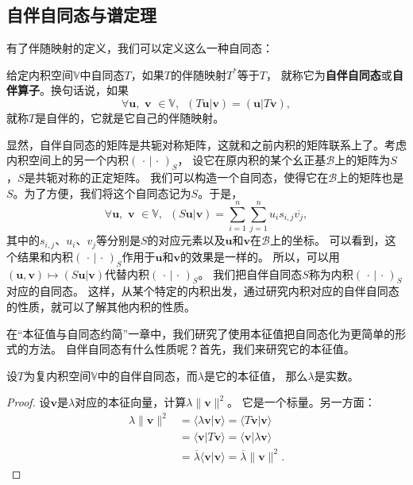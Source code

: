 \documentclass[12pt,UTF8,fontset=none]{ctexbook}
\begin{document}
\subsection{自伴自同态与谱定理}
有了伴随映射的定义，我们可以定义这么一种自同态：
\begin{df}\label{df:8_2}
    给定内积空间$\mathbb{V}$中自同态$T$，如果$T$的伴随映射$T^*$等于$T$，
    就称它为\textbf{自伴自同态}或\textbf{自伴算子}。换句话说，如果
    $$ \forall \mathbf{u}, \,\, \mathbf{v} \,\, \in \mathbb{V},\,\,\, (T\mathbf{u} | \mathbf{v}) = (\mathbf{u} | T\mathbf{v}), $$
    就称$T$是自伴的，它就是它自己的伴随映射。
\end{df}
显然，自伴自同态的矩阵是共轭对称矩阵，这就和之前内积的矩阵联系上了。考虑内积空间上的另一个内积$(\, \cdot \, | \, \cdot \,)_{S}$，
设它在原内积的某个幺正基$\mathcal{B}$上的矩阵为$S$，$S$是共轭对称的正定矩阵。
我们可以构造一个自同态，使得它在$\mathcal{B}$上的矩阵也是$S$。为了方便，我们将这个自同态记为$S$。于是，
$$ \forall \mathbf{u}, \,\, \mathbf{v} \,\, \in \mathbb{V},\,\,\, (S\mathbf{u} | \mathbf{v}) = \sum_{i=1}^n \sum_{j=1}^n u_i s_{i,j} \overline{v_j},$$
其中的$s_{i,j}$、$u_i$、$v_j$等分别是$S$的对应元素以及$\mathbf{u}$和$\mathbf{v}$在$\mathcal{B}$上的坐标。
可以看到，这个结果和内积$(\, \cdot \, | \, \cdot \,)_{S}$作用于$\mathbf{u}$和$\mathbf{v}$的效果是一样的。
所以，可以用$(\mathbf{u}, \mathbf{v} ) \mapsto (S\mathbf{u} | \mathbf{v}) $代替内积$(\, \cdot \, | \, \cdot \,)_{S}$。
我们把自伴自同态$S$称为内积$(\, \cdot \, | \, \cdot \,)_{S}$对应的自同态。
这样，从某个特定的内积出发，通过研究内积对应的自伴自同态的性质，就可以了解其他内积的性质。

在“本征值与自同态约简”一章中，我们研究了使用本征值把自同态化为更简单的形式的方法。
自伴自同态有什么性质呢？首先，我们来研究它的本征值。

\begin{pp}\label{pp:8_7}
    设$T$为复内积空间$\mathbb{V}$中的自伴自同态，而$\lambda$是它的本征值，
    那么$\lambda$是实数。
\end{pp}
\begin{proof} %
    设$\mathbf{v}$是$\lambda$对应的本征向量，计算$\lambda \|\mathbf{v}\|^2$。
    它是一个标量。另一方面：
    \begin{align*} 
        \lambda \|\mathbf{v}\|^2 &= \langle \lambda \mathbf{v} | \mathbf{v} \rangle = \langle T\mathbf{v} | \mathbf{v} \rangle  \\
        &= \langle \mathbf{v} | T \mathbf{v} \rangle = \langle \mathbf{v} | \lambda \mathbf{v} \rangle  \\
        &= \overline{\lambda} \langle \mathbf{v} | \mathbf{v} \rangle = \overline{\lambda} \|\mathbf{v}\|^2. 
    \end{align*}
\end{proof}
\end{document}
